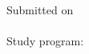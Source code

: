 \begin{titlepage}
\begin{center}
\vfill

{\large
Submitted on\\
\tdate\\
\vspace{1.5cm}
Study program:\\
\studyprog\\
}
\vfill
\end{center}
\end{titlepage}
\restoregeometry

